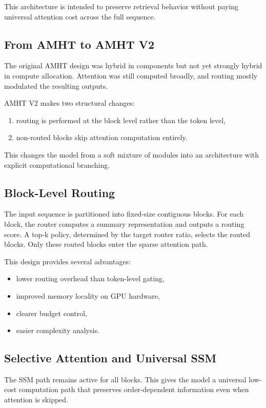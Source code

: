 \documentclass[11pt]{article}
\begin{document}
This architecture is intended to preserve retrieval behavior without paying universal attention cost across the full sequence.

\subsection{From AMHT to AMHT V2}
The original AMHT design was hybrid in components but not yet strongly hybrid in compute allocation. Attention was still computed broadly, and routing mostly modulated the resulting outputs.

AMHT V2 makes two structural changes:
\begin{enumerate}
  \item routing is performed at the block level rather than the token level,
  \item non-routed blocks skip attention computation entirely.
\end{enumerate}

This changes the model from a soft mixture of modules into an architecture with explicit computational branching.

\subsection{Block-Level Routing}
The input sequence is partitioned into fixed-size contiguous blocks. For each block, the router computes a summary representation and outputs a routing score. A top-k policy, determined by the target router ratio, selects the routed blocks. Only these routed blocks enter the sparse attention path.

This design provides several advantages:
\begin{itemize}
  \item lower routing overhead than token-level gating,
  \item improved memory locality on GPU hardware,
  \item clearer budget control,
  \item easier complexity analysis.
\end{itemize}

\subsection{Selective Attention and Universal SSM}
The SSM path remains active for all blocks. This gives the model a universal low-cost computation path that preserves order-dependent information even when attention is skipped.
\end{document}
